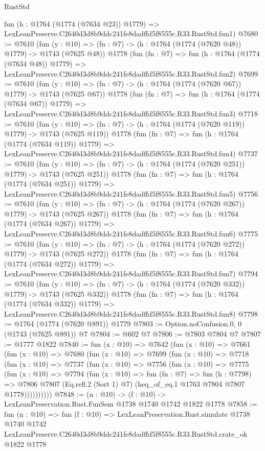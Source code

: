 \begin{lexlean}{RustStd}
\begin{coremodule}
    fun (h : @1764 (@1774 (@7634 @23)) @1779) =>
    LexLeanPreserve.C2640d3d8b9ddc241fe8dadffd5f8555c.R33.RustStd.fun1)
@7680 := @7610
    (fun (y : @10) => (fn : @7) -> (h : @1764 (@1774 (@7620 @48)) @1779) -> @1743 (@7625 @48))
    @1778
    (fun (fn : @7) =>
    fun (h : @1764 (@1774 (@7634 @48)) @1779) =>
    LexLeanPreserve.C2640d3d8b9ddc241fe8dadffd5f8555c.R33.RustStd.fun2)
@7699 := @7610
    (fun (y : @10) => (fn : @7) -> (h : @1764 (@1774 (@7620 @67)) @1779) -> @1743 (@7625 @67))
    @1778
    (fun (fn : @7) =>
    fun (h : @1764 (@1774 (@7634 @67)) @1779) =>
    LexLeanPreserve.C2640d3d8b9ddc241fe8dadffd5f8555c.R33.RustStd.fun3)
@7718 := @7610
    (fun (y : @10) => (fn : @7) -> (h : @1764 (@1774 (@7620 @119)) @1779) -> @1743 (@7625 @119))
    @1778
    (fun (fn : @7) =>
    fun (h : @1764 (@1774 (@7634 @119)) @1779) =>
    LexLeanPreserve.C2640d3d8b9ddc241fe8dadffd5f8555c.R33.RustStd.fun4)
@7737 := @7610
    (fun (y : @10) => (fn : @7) -> (h : @1764 (@1774 (@7620 @251)) @1779) -> @1743 (@7625 @251))
    @1778
    (fun (fn : @7) =>
    fun (h : @1764 (@1774 (@7634 @251)) @1779) =>
    LexLeanPreserve.C2640d3d8b9ddc241fe8dadffd5f8555c.R33.RustStd.fun5)
@7756 := @7610
    (fun (y : @10) => (fn : @7) -> (h : @1764 (@1774 (@7620 @267)) @1779) -> @1743 (@7625 @267))
    @1778
    (fun (fn : @7) =>
    fun (h : @1764 (@1774 (@7634 @267)) @1779) =>
    LexLeanPreserve.C2640d3d8b9ddc241fe8dadffd5f8555c.R33.RustStd.fun6)
@7775 := @7610
    (fun (y : @10) => (fn : @7) -> (h : @1764 (@1774 (@7620 @272)) @1779) -> @1743 (@7625 @272))
    @1778
    (fun (fn : @7) =>
    fun (h : @1764 (@1774 (@7634 @272)) @1779) =>
    LexLeanPreserve.C2640d3d8b9ddc241fe8dadffd5f8555c.R33.RustStd.fun7)
@7794 := @7610
    (fun (y : @10) => (fn : @7) -> (h : @1764 (@1774 (@7620 @332)) @1779) -> @1743 (@7625 @332))
    @1778
    (fun (fn : @7) =>
    fun (h : @1764 (@1774 (@7634 @332)) @1779) =>
    LexLeanPreserve.C2640d3d8b9ddc241fe8dadffd5f8555c.R33.RustStd.fun8)
@7798 := @1764 (@1774 (@7620 @891)) @1779
@7803 := Option.noConfusion.{0, 0} (@1743 (@7625 @891)) @7
@7804 := @602 @7
@7806 := @7803 @7804 @7
@7807 := @1777 @1822
@7840 := fun (x : @10) =>
  @7642
    (fun (x : @10) =>
    @7661
      (fun (x : @10) =>
      @7680
        (fun (x : @10) =>
        @7699
          (fun (x : @10) =>
          @7718
            (fun (x : @10) =>
            @7737
              (fun (x : @10) =>
              @7756
                (fun (x : @10) =>
                @7775
                  (fun (x : @10) =>
                  @7794
                    (fun (x : @10) =>
                    fun (fn : @7) =>
                    fun (h : @7798) =>
                    @7806
                      @7807
                      (Eq.refl.{2} (Sort 1) @7)
                      (heq_of_eq.{1} @1763 @7804 @7807 @1778))))))))))
@7848 := (n : @10) -> (f : @10) -> LexLeanPreservation.Rust.FunSem @1738 @1740 @1742 @1822 @1778
@7858 := fun (n : @10) =>
  fun (f : @10) =>
  LexLeanPreservation.Rust.simulate
    @1738
    @1740
    @1742
    LexLeanPreserve.C2640d3d8b9ddc241fe8dadffd5f8555c.R33.RustStd.crate_ok
    @1822
    @1778
\end{coremodule}
\end{lexlean}
